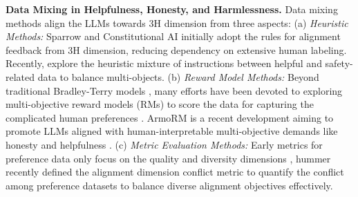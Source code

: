 \textbf{Data Mixing in Helpfulness, Honesty, and Harmlessness.} Data mixing methods align the LLMs towards 3H dimension from  three aspects:
(a) \textit{Heuristic Methods:} Sparrow \cite{74eae12620bd1c1393e268bddcb6f129a5025166} and Constitutional AI \cite{3936fd3c6187f606c6e4e2e20b196dbc41cc4654} initially adopt the rules for alignment feedback from 3H dimension, reducing dependency on extensive human labeling. Recently, \cite{bianchi2023safety,amballa2024safe} explore the heuristic mixture of instructions between helpful and safety-related data to balance multi-objects.
(b) \textit{Reward Model Methods:} Beyond traditional Bradley-Terry models \citep{bradley1952rank, ouyang2022training}, many efforts have been devoted to exploring multi-objective reward models (RMs) to score the data for capturing the complicated human preferences \cite{touvron2023llama,wang2023helpsteer,wang2024arithmetic}. ArmoRM is a recent development aiming to promote LLMs aligned with human-interpretable multi-objective demands like honesty and helpfulness \cite{wang2024interpretable}.
(c) \textit{Metric Evaluation Methods:} Early metrics for preference data only focus on the quality and diversity dimensions \citep{cui2023ultrafeedback,wu2023fine}, hummer recently defined the alignment dimension conflict metric \cite{jiang2024hummer} to quantify the conflict among preference datasets to balance diverse alignment objectives effectively.





